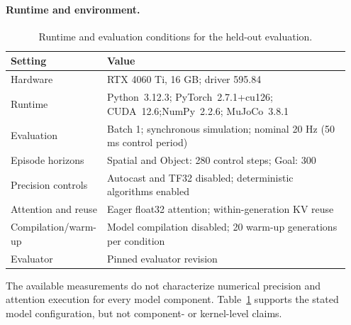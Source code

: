 \documentclass{article}
\begin{document}
\paragraph{Runtime and environment.}
\begin{table}[H]
\centering\small
\caption{Runtime and evaluation conditions for the held-out evaluation.}
\label{tab:runtime}
\begin{tabular}{@{}>{\raggedright\arraybackslash}p{0.24\linewidth}>{\raggedright\arraybackslash}p{0.71\linewidth}@{}}
\toprule
Setting & Value\\
\midrule
Hardware & RTX 4060 Ti, 16 GB; driver 595.84\\
Runtime & Python~3.12.3; PyTorch~2.7.1+cu126; CUDA~12.6;\newline NumPy~2.2.6; MuJoCo~3.8.1\\
\addlinespace[3pt]
Evaluation & Batch 1; synchronous simulation; nominal 20 Hz (50 ms control period)\\
Episode horizons & Spatial and Object: 280 control steps; Goal: 300\\
\addlinespace[3pt]
Precision controls & Autocast and TF32 disabled; deterministic algorithms enabled\\
Attention and reuse & Eager float32 attention; within-generation KV reuse\\
Compilation/warm-up & Model compilation disabled; 20 warm-up generations per condition\\
\addlinespace[3pt]
Evaluator & Pinned evaluator revision\\
\bottomrule
\end{tabular}
\end{table}

The available measurements do not characterize numerical precision and
attention execution for every model component. Table~\ref{tab:runtime} supports
the stated model configuration, but not component- or kernel-level claims.
\end{document}
